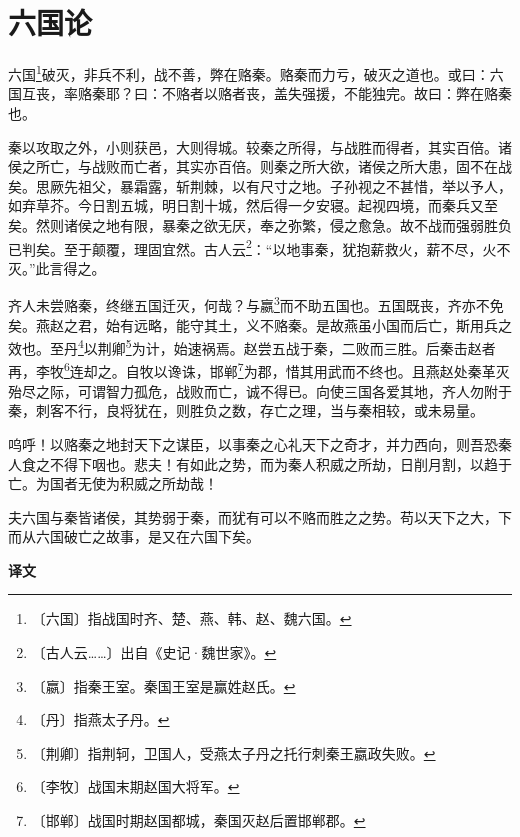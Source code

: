 \documentclass[12pt,UTF-8,openany,a4]{ctexbook}
\begin{document}
\chapter{六国论}

\begin{large}
    
    六国\footnote{〔六国〕\yiwen 指战国时齐、楚、燕、韩、赵、魏六国。}破灭，非兵不利，战不善，弊在赂秦。赂秦而力亏，破灭之道也。或曰：六国互丧，率赂秦耶？曰：不赂者以赂者丧，盖失强援，不能独完。故曰：弊在赂秦也。
    
    秦以攻取之外，小则获邑，大则得城。较秦之所得，与战胜而得者，其实百倍。诸侯之所亡，与战败而亡者，其实亦百倍。则秦之所大欲，诸侯之所大患，固不在战矣。思厥先祖父，暴霜露，斩荆棘，以有尺寸之地。子孙视之不甚惜，举以予人，如弃草芥。今日割五城，明日割十城，然后得一夕安寝。起视四境，而秦兵又至矣。然则诸侯之地有限，暴秦之欲无厌，奉之弥繁，侵之愈急。故不战而强弱胜负已判矣。至于颠覆，理固宜然。古人云\footnote{〔古人云……〕\yiwen 出自《史记·魏世家》。}：“以地事秦，犹抱薪救火，薪不尽，火不灭。”此言得之。
    
    齐人未尝赂秦，终继五国迁灭，何哉？与嬴\footnote{〔嬴〕\yiwen 指秦王室。秦国王室是赢姓赵氏。}而不助五国也。五国既丧，齐亦不免矣。燕赵之君，始有远略，能守其土，义不赂秦。是故燕虽小国而后亡，斯用兵之效也。至丹\footnote{〔丹〕\yiwen 指燕太子丹。}以荆卿\footnote{〔荆卿〕\yiwen 指荆轲，卫国人，受燕太子丹之托行刺秦王嬴政失败。}为计，始速祸焉。赵尝五战于秦，二败而三胜。后秦击赵者再，李牧\footnote{〔李牧〕\yiwen 战国末期赵国大将军。}连却之。自牧以谗诛，邯郸\footnote{〔邯郸〕\yiwen 战国时期赵国都城，秦国灭赵后置邯郸郡。}为郡，惜其用武而不终也。且燕赵处秦革灭殆尽之际，可谓智力孤危，战败而亡，诚不得已。向使三国各爱其地，齐人勿附于秦，刺客不行，良将犹在，则胜负之数，存亡之理，当与秦相较，或未易量。
    
    呜呼！以赂秦之地封天下之谋臣，以事秦之心礼天下之奇才，并力西向，则吾恐秦人食之不得下咽也。悲夫！有如此之势，而为秦人积威之所劫，日削月割，以趋于亡。为国者无使为积威之所劫哉！
    
    夫六国与秦皆诸侯，其势弱于秦，而犹有可以不赂而胜之之势。苟以天下之大，下而从六国破亡之故事，是又在六国下矣。
\end{large}


\newpage

\begin{Large}
    \noindent\textbf{译文}
\end{Large}


\vspace{1em}
\end{document}
